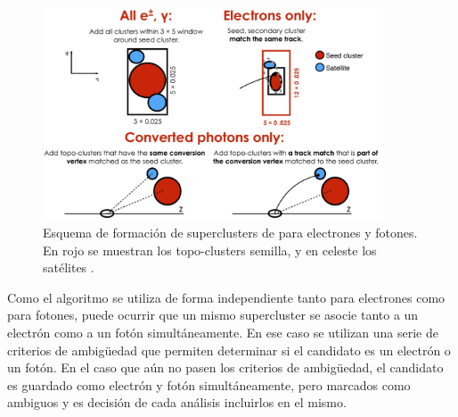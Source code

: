  \begin{figure}
   \includegraphics[width=0.9\textwidth]{images/objects/superclusters_sat.png}
   \caption{Esquema de formación de superclusters de para electrones y fotones. En rojo se muestran los topo-clusters semilla, y en celeste los satélites \cite{EGAM-2018-01}.}
   \label{fig:superclusters_sat}
 \end{figure}

Como el algoritmo se utiliza de forma independiente tanto para electrones como para fotones, puede ocurrir que un mismo supercluster se asocie tanto a un electrón como a un fotón simultáneamente. En ese caso se utilizan una serie de criterios de ambigüedad que permiten determinar si el candidato es un electrón o un fotón. En el caso que aún no pasen los criterios de ambigüedad, el candidato es guardado como electrón y fotón simultáneamente, pero marcados como ambiguos y es decisión de cada análisis incluirlos en el mismo. 




